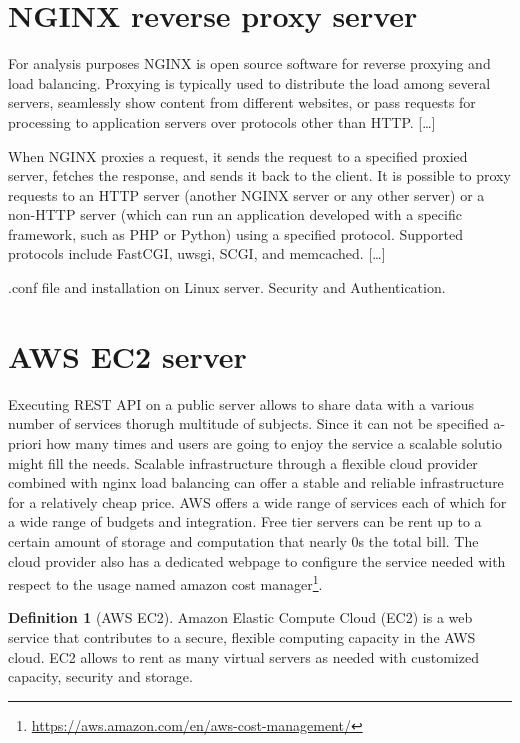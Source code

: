 \documentclass[
  12pt,
  a4paper,
  oneside]{book}
\DeclareRobustCommand{\href}[2]{#2\footnote{\url{#1}}}
\theoremstyle{definition}
\newtheorem{definition}{Definition}[chapter]
\theoremstyle{definition}
\theoremstyle{definition}
\theoremstyle{remark}
\begin{document}
\hypertarget{nginx}{%
\section{NGINX reverse proxy server}\label{nginx}}

For analysis purposes NGINX is open source software for reverse proxying and load balancing.
Proxying is typically used to distribute the load among several servers, seamlessly show content from different websites, or pass requests for processing to application servers over protocols other than HTTP.
{[}\ldots{]}

When NGINX proxies a request, it sends the request to a specified proxied server, fetches the response, and sends it back to the client. It is possible to proxy requests to an HTTP server (another NGINX server or any other server) or a non-HTTP server (which can run an application developed with a specific framework, such as PHP or Python) using a specified protocol. Supported protocols include FastCGI, uwsgi, SCGI, and memcached.
{[}\ldots{]}

.conf file and installation on Linux server. Security and Authentication.

\hypertarget{aws}{%
\section{AWS EC2 server}\label{aws}}

Executing REST API on a public server allows to share data with a various number of services thorugh multitude of subjects. Since it can not be specified a-priori how many times and users are going to enjoy the service a scalable solutio might fill the needs. Scalable infrastructure through a flexible cloud provider combined with nginx load balancing can offer a stable and reliable infrastructure for a relatively cheap price.
AWS offers a wide range of services each of which for a wide range of budgets and integration. Free tier servers can be rent up to a certain amount of storage and computation that nearly 0s the total bill. The cloud provider also has a dedicated webpage to configure the service needed with respect to the usage named \href{https://aws.amazon.com/en/aws-cost-management/}{amazon cost manager}.

\begin{definition}[AWS EC2]
\protect\hypertarget{def:aws}{}{\label{def:aws} {} }Amazon Elastic Compute Cloud (EC2) is a web service that contributes to a secure, flexible computing capacity in the AWS cloud. EC2 allows to rent as many virtual servers as needed with customized capacity, security and storage.
\end{definition}
\end{document}
